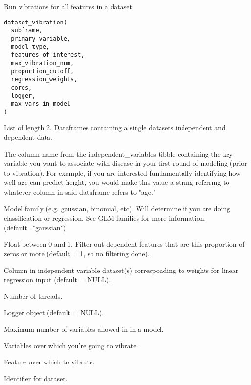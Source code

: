 \documentclass[a4paper]{book}
\begin{document}
%
\begin{Description}\relax
Run vibrations for all features in a dataset
\end{Description}
%
\begin{Usage}
\begin{verbatim}
dataset_vibration(
  subframe,
  primary_variable,
  model_type,
  features_of_interest,
  max_vibration_num,
  proportion_cutoff,
  regression_weights,
  cores,
  logger,
  max_vars_in_model
)
\end{verbatim}
\end{Usage}
%
\begin{Arguments}
\begin{ldescription}
\item[\code{subframe}] List of length 2. Dataframes containing a single datasets independent and dependent data.

\item[\code{primary\_variable}] The column name from the independent\_variables tibble containing the key variable you want to associate with disease in your first round of modeling (prior to vibration). For example, if you are interested fundamentally identifying how well age can predict height, you would make this value a string referring to whatever column in said dataframe refers to "age."

\item[\code{model\_type}] Model family (e.g. gaussian, binomial, etc). Will determine if you are doing classification or regression. See GLM families for more information. (default="gaussian")

\item[\code{proportion\_cutoff}] Float between 0 and 1. Filter out dependent features that are this proportion of zeros or more (default = 1, so no filtering done).

\item[\code{regression\_weights}] Column in independent variable dataset(s) corresponding to weights  for linear regression input (default = NULL).

\item[\code{cores}] Number of threads.

\item[\code{logger}] Logger object (default = NULL).

\item[\code{max\_vars\_in\_model}] Maximum number of variables allowed in in a model.

\item[\code{variables\_to\_vibrate}] Variables over which you're going to vibrate.

\item[\code{feature}] Feature over which to vibrate.

\item[\code{dataset\_id}] Identifier for dataset.
\end{ldescription}
\end{Arguments}
\end{document}
